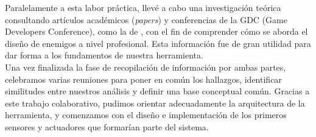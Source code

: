 Paralelamente a esta labor práctica, llevé a cabo una investigación teórica consultando artículos académicos (\textit{papers}) y conferencias de la GDC (Game Developers Conference), como la de \cite{PlantsVsZombies}, con el fin de comprender cómo se aborda el diseño de enemigos a nivel profesional. Esta información fue de gran utilidad para dar forma a los fundamentos de nuestra herramienta.\\

Una vez finalizada la fase de recopilación de información por ambas partes, celebramos varias reuniones para poner en común los hallazgos, identificar similitudes entre nuestros análisis y definir una base conceptual común. Gracias a este trabajo colaborativo, pudimos orientar adecuadamente la arquitectura de la herramienta, y comenzamos con el diseño e implementación de los primeros sensores y actuadores que formarían parte del sistema.\\

